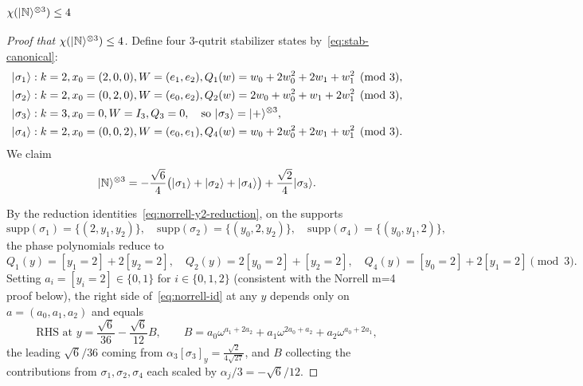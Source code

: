 \documentclass[11pt]{article}
\theoremstyle{definition}
\newcommand{\microspace}{\mspace{0.5mu}}
\newcommand{\ket}[1]{\lvert\microspace #1 \microspace \rangle}
\newcommand{\chiR}{\chi}
\newcommand{\Norrell}{\ket{\mathbb{N}}}
\begin{document}
	\subsubsection{\texorpdfstring{$\chiR(\Norrell^{\otimes 3}) \le 4$}{chi(N tensor 3) <= 4}}\label{app:norrell-m3}
	
	\begin{proof}[Proof that $\chiR(\Norrell^{\otimes 3}) \le 4$]
		Define four 3-qutrit stabilizer states by~\eqref{eq:stab-canonical}:
		\begin{equation}
			\begin{aligned}
				\ket{\sigma_1} &: k = 2, x_0 = (2,0,0), 
				W = (e_1, e_2), 
				Q_1(w) = w_0 + 2 w_0^2 + 2 w_1 + w_1^2 \pmod 3, \\
				\ket{\sigma_2} &: k = 2, x_0 = (0,2,0), 
				W = (e_0, e_2), 
				Q_2(w) = 2 w_0 + w_0^2 + w_1 + 2 w_1^2 \pmod 3, \\
				\ket{\sigma_3} &: k = 3, x_0 = 0, 
				W = I_3, 
				Q_3 = 0, \quad \text{so } \ket{\sigma_3} = \ket{+}^{\otimes 3}, \\
				\ket{\sigma_4} &: k = 2, x_0 = (0,0,2), 
				W = (e_0, e_1), 
				Q_4(w) = w_0 + 2 w_0^2 + 2 w_1 + w_1^2 \pmod 3.
			\end{aligned}
		\end{equation}
		We claim
		\begin{equation}\label{eq:norrell-id}
			\Norrell^{\otimes 3}
			= -\frac{\sqrt 6}{4} \big( \ket{\sigma_1} + \ket{\sigma_2} + \ket{\sigma_4} \big)
			+ \frac{\sqrt 2}{4}  \ket{\sigma_3}.
		\end{equation}
		
		By the reduction
		identities~\eqref{eq:norrell-y2-reduction}, on the supports
		\begin{equation}\label{eq:norrell-m3-supp}
			\mathrm{supp}(\sigma_1) = \{(2, y_1, y_2)\}, \quad
			\mathrm{supp}(\sigma_2) = \{(y_0, 2, y_2)\}, \quad
			\mathrm{supp}(\sigma_4) = \{(y_0, y_1, 2)\},
		\end{equation}
		the phase polynomials reduce to
		\begin{equation}
			Q_1(y) = [y_1{=}2] + 2 [y_2{=}2], \quad
			Q_2(y) = 2 [y_0{=}2] + [y_2{=}2], \quad
			Q_4(y) = [y_0{=}2] + 2 [y_1{=}2] \pmod 3.
		\end{equation}
		Setting $a_i = [y_i = 2] \in \{0, 1\}$ for $i \in \{0, 1, 2\}$
		(consistent with the Norrell m=4 proof below), the right side
		of~\eqref{eq:norrell-id} at any $y$ depends only on
		$a = (a_0, a_1, a_2)$ and equals
		\begin{equation}\label{eq:norrell-rhs}
			\text{RHS at } y
			= \frac{\sqrt 6}{36} - \frac{\sqrt 6}{12} B,
			\qquad
			B = a_0 \omega^{a_1 + 2 a_2} + a_1 \omega^{2 a_0 + a_2}
			+ a_2 \omega^{a_0 + 2 a_1},
		\end{equation}
		the leading $\sqrt 6 / 36$ coming from
		$\alpha_3 [\sigma_3]_y = \frac{\sqrt 2}{4 \sqrt{27}}$, and $B$ collecting
		the contributions from $\sigma_1, \sigma_2, \sigma_4$ each scaled by
		$\alpha_j / 3 = -\sqrt 6 / 12$.
		

\end{proof}
\end{document}
